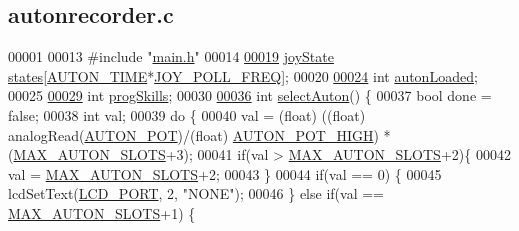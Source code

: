 \hypertarget{autonrecorder_8c_source}{}\subsection{autonrecorder.\+c}
\label{autonrecorder_8c_source}

\begin{DoxyCode}
00001 
00013 \textcolor{preprocessor}{#include "\hyperlink{main_8h}{main.h}"}
00014 
\hypertarget{autonrecorder_8c_source.tex_l00019}{}\hyperlink{autonrecorder_8h_a904e0a0d44a852a7df1122a3c7fecdef}{00019} \hyperlink{structjoy_state}{joyState} \hyperlink{autonrecorder_8c_a904e0a0d44a852a7df1122a3c7fecdef}{states}[\hyperlink{autonrecorder_8h_aa19f7c427989a0a67f55958c610d0355}{AUTON\_TIME}*\hyperlink{autonrecorder_8h_a3d2260a30e7ce727bef0402edee4b205}{JOY\_POLL\_FREQ}];
00020 
\hypertarget{autonrecorder_8c_source.tex_l00024}{}\hyperlink{autonrecorder_8h_a4e72d907ee74449b71b5e20943f4217e}{00024} \textcolor{keywordtype}{int} \hyperlink{autonrecorder_8c_a4e72d907ee74449b71b5e20943f4217e}{autonLoaded};
00025 
\hypertarget{autonrecorder_8c_source.tex_l00029}{}\hyperlink{autonrecorder_8h_aa2eda471576bdbaf33835a71da9bc616}{00029} \textcolor{keywordtype}{int} \hyperlink{autonrecorder_8c_aa2eda471576bdbaf33835a71da9bc616}{progSkills};
00030 
\hypertarget{autonrecorder_8c_source.tex_l00036}{}\hyperlink{autonrecorder_8c_a7233586e332461dc25c7cc950a08d429}{00036} \textcolor{keywordtype}{int} \hyperlink{autonrecorder_8c_a7233586e332461dc25c7cc950a08d429}{selectAuton}() \{
00037     \textcolor{keywordtype}{bool} done = \textcolor{keyword}{false};
00038     \textcolor{keywordtype}{int} val;
00039     \textcolor{keywordflow}{do} \{
00040         val = (float) ((\textcolor{keywordtype}{float}) analogRead(\hyperlink{autonrecorder_8h_a2490cda7a399f481333af2e5589b74a9}{AUTON\_POT})/(float) 
      \hyperlink{autonrecorder_8h_a01989d89b8bed150d0aacdaef5ccabd3}{AUTON\_POT\_HIGH}) * (\hyperlink{autonrecorder_8h_a5173a11a545cb4020fdd139552dc15c1}{MAX\_AUTON\_SLOTS}+3);
00041         \textcolor{keywordflow}{if}(val > \hyperlink{autonrecorder_8h_a5173a11a545cb4020fdd139552dc15c1}{MAX\_AUTON\_SLOTS}+2)\{
00042             val = \hyperlink{autonrecorder_8h_a5173a11a545cb4020fdd139552dc15c1}{MAX\_AUTON\_SLOTS}+2;
00043         \}
00044         \textcolor{keywordflow}{if}(val == 0) \{
00045             lcdSetText(\hyperlink{lcdmsg_8h_abcf42bd88b3c36193f301ca25b033875}{LCD\_PORT}, 2, \textcolor{stringliteral}{"NONE"});
00046         \} \textcolor{keywordflow}{else} \textcolor{keywordflow}{if}(val == \hyperlink{autonrecorder_8h_a5173a11a545cb4020fdd139552dc15c1}{MAX\_AUTON\_SLOTS}+1) \{

\end{DoxyCode}
